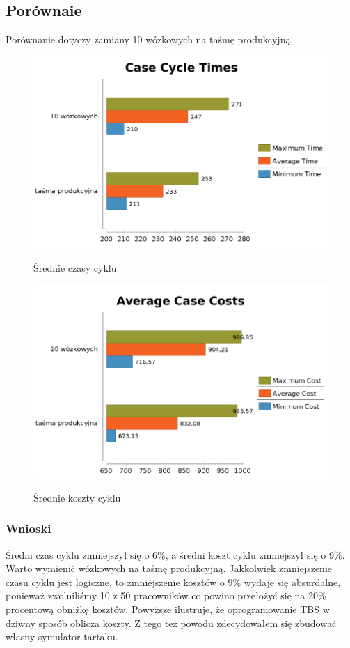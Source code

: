 \documentclass[a4paper]{article}
\begin{document}
\subsection{Porównaie}
Porównanie dotyczy zamiany 10 wózkowych na taśmę produkcyjną.
\begin{figure}[H]
\centering
\includegraphics[scale=0.3]{img/case-times.png}
\label{img:cost}
\caption{Średnie czasy cyklu}
\end{figure}
\begin{figure}[H]
\centering
\includegraphics[scale=0.3]{img/case-cost.png}
\label{img:cost}
\caption{Średnie koszty cyklu}
\end{figure}
\subsubsection{Wnioski}
Średni czas cyklu zmniejszył się o 6\%, a średni koszt cyklu zmniejszył się o 9\%. Warto wymienić wózkowych na taśmę produkcyjną. Jakkolwiek zmniejszenie czasu cyklu jest logiczne, to zmniejszenie kosztów o 9\% wydaje się absurdalne, ponieważ zwolniliśmy 10 z 50 pracowników co powino przełożyć się na 20\% procentową obniżkę kosztów. Powyższe ilustruje, że oprogramowanie TBS w dziwny sposób oblicza koszty. Z tego też powodu zdecydowałem się zbudować własny symulator tartaku.
\end{document}
